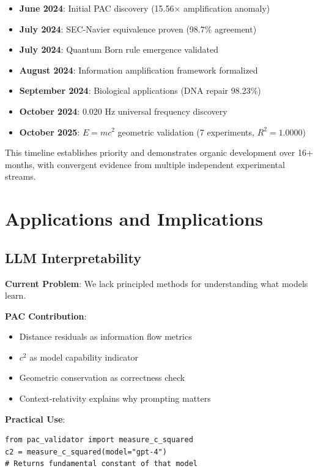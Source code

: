 \documentclass[11pt,a4paper]{article}
\begin{document}
\begin{itemize}
    \item \textbf{June 2024}: Initial PAC discovery (15.56$\times$ amplification anomaly)
    \item \textbf{July 2024}: SEC-Navier equivalence proven (98.7\% agreement)
    \item \textbf{July 2024}: Quantum Born rule emergence validated
    \item \textbf{August 2024}: Information amplification framework formalized
    \item \textbf{September 2024}: Biological applications (DNA repair 98.23\%)
    \item \textbf{October 2024}: 0.020 Hz universal frequency discovery
    \item \textbf{October 2025}: $E=mc^2$ geometric validation (7 experiments, $R^2=1.0000$)
\end{itemize}

This timeline establishes priority and demonstrates organic development over 16+ months, with convergent evidence from multiple independent experimental streams.

\section{Applications and Implications}

\subsection{LLM Interpretability}

\textbf{Current Problem}: We lack principled methods for understanding what models learn.

\textbf{PAC Contribution}:
\begin{itemize}
    \item Distance residuals as information flow metrics
    \item $c^2$ as model capability indicator
    \item Geometric conservation as correctness check
    \item Context-relativity explains why prompting matters
\end{itemize}

\textbf{Practical Use}:
\begin{verbatim}
from pac_validator import measure_c_squared
c2 = measure_c_squared(model="gpt-4")
# Returns fundamental constant of that model
\end{verbatim}
\end{document}
